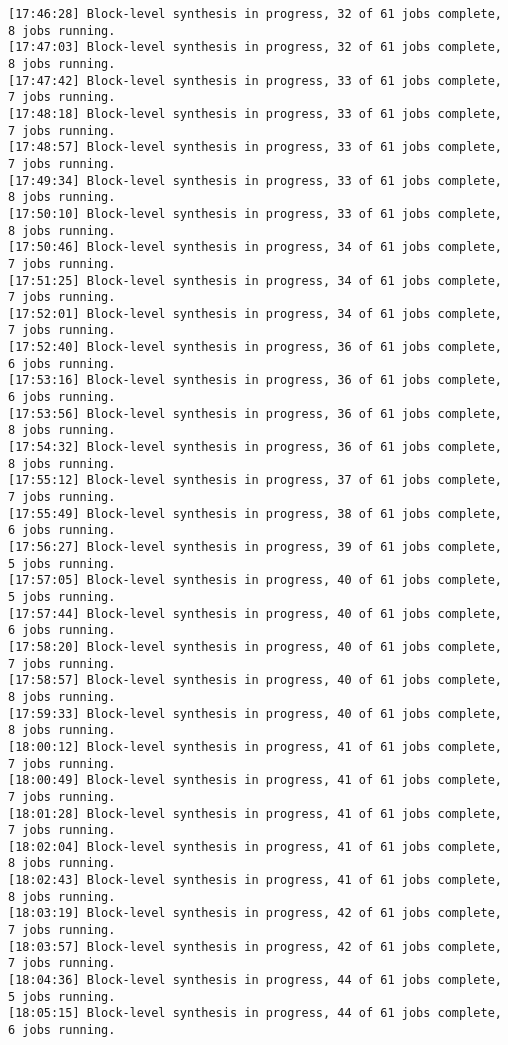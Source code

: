 \begin{lstlisting}[label=some-code-2,caption=Содержимое файла v++\_vinc.log]
[17:46:28] Block-level synthesis in progress, 32 of 61 jobs complete, 8 jobs running.
[17:47:03] Block-level synthesis in progress, 32 of 61 jobs complete, 8 jobs running.
[17:47:42] Block-level synthesis in progress, 33 of 61 jobs complete, 7 jobs running.
[17:48:18] Block-level synthesis in progress, 33 of 61 jobs complete, 7 jobs running.
[17:48:57] Block-level synthesis in progress, 33 of 61 jobs complete, 7 jobs running.
[17:49:34] Block-level synthesis in progress, 33 of 61 jobs complete, 8 jobs running.
[17:50:10] Block-level synthesis in progress, 33 of 61 jobs complete, 8 jobs running.
[17:50:46] Block-level synthesis in progress, 34 of 61 jobs complete, 7 jobs running.
[17:51:25] Block-level synthesis in progress, 34 of 61 jobs complete, 7 jobs running.
[17:52:01] Block-level synthesis in progress, 34 of 61 jobs complete, 7 jobs running.
[17:52:40] Block-level synthesis in progress, 36 of 61 jobs complete, 6 jobs running.
[17:53:16] Block-level synthesis in progress, 36 of 61 jobs complete, 6 jobs running.
[17:53:56] Block-level synthesis in progress, 36 of 61 jobs complete, 8 jobs running.
[17:54:32] Block-level synthesis in progress, 36 of 61 jobs complete, 8 jobs running.
[17:55:12] Block-level synthesis in progress, 37 of 61 jobs complete, 7 jobs running.
[17:55:49] Block-level synthesis in progress, 38 of 61 jobs complete, 6 jobs running.
[17:56:27] Block-level synthesis in progress, 39 of 61 jobs complete, 5 jobs running.
[17:57:05] Block-level synthesis in progress, 40 of 61 jobs complete, 5 jobs running.
[17:57:44] Block-level synthesis in progress, 40 of 61 jobs complete, 6 jobs running.
[17:58:20] Block-level synthesis in progress, 40 of 61 jobs complete, 7 jobs running.
[17:58:57] Block-level synthesis in progress, 40 of 61 jobs complete, 8 jobs running.
[17:59:33] Block-level synthesis in progress, 40 of 61 jobs complete, 8 jobs running.
[18:00:12] Block-level synthesis in progress, 41 of 61 jobs complete, 7 jobs running.
[18:00:49] Block-level synthesis in progress, 41 of 61 jobs complete, 7 jobs running.
[18:01:28] Block-level synthesis in progress, 41 of 61 jobs complete, 7 jobs running.
[18:02:04] Block-level synthesis in progress, 41 of 61 jobs complete, 8 jobs running.
[18:02:43] Block-level synthesis in progress, 41 of 61 jobs complete, 8 jobs running.
[18:03:19] Block-level synthesis in progress, 42 of 61 jobs complete, 7 jobs running.
[18:03:57] Block-level synthesis in progress, 42 of 61 jobs complete, 7 jobs running.
[18:04:36] Block-level synthesis in progress, 44 of 61 jobs complete, 5 jobs running.
[18:05:15] Block-level synthesis in progress, 44 of 61 jobs complete, 6 jobs running.

\end{lstlisting}
